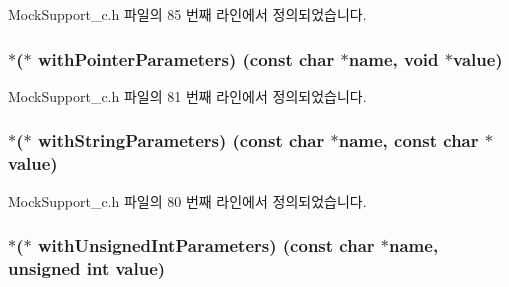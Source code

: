 Mock\+Support\+\_\+c.\+h 파일의 85 번째 라인에서 정의되었습니다.

\subsubsection[{\texorpdfstring{with\+Pointer\+Parameters}{withPointerParameters}}]{$\ast$($\ast$ with\+Pointer\+Parameters) (const char $\ast$name, void $\ast$value)}\hypertarget{struct_s_mock_actual_call__c_a53a16e27e4df7be9ae48fb29e26e8ea5}{}\label{struct_s_mock_actual_call__c_a53a16e27e4df7be9ae48fb29e26e8ea5}


Mock\+Support\+\_\+c.\+h 파일의 81 번째 라인에서 정의되었습니다.

\subsubsection[{\texorpdfstring{with\+String\+Parameters}{withStringParameters}}]{$\ast$($\ast$ with\+String\+Parameters) (const char $\ast$name, const char $\ast$value)}\hypertarget{struct_s_mock_actual_call__c_aa0a720408e4b251f4596735a09f15ae2}{}\label{struct_s_mock_actual_call__c_aa0a720408e4b251f4596735a09f15ae2}


Mock\+Support\+\_\+c.\+h 파일의 80 번째 라인에서 정의되었습니다.

\subsubsection[{\texorpdfstring{with\+Unsigned\+Int\+Parameters}{withUnsignedIntParameters}}]{$\ast$($\ast$ with\+Unsigned\+Int\+Parameters) (const char $\ast$name, unsigned int value)}\hypertarget{struct_s_mock_actual_call__c_a825d367ebb53a347f646656176c52636}{}\label{struct_s_mock_actual_call__c_a825d367ebb53a347f646656176c52636}


